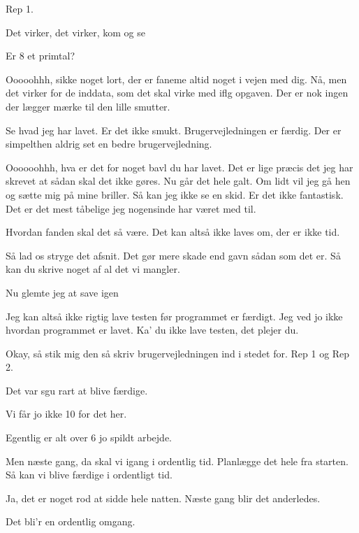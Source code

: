 \documentclass[a4paper,11pt]{article}
\begin{document}
\begin{sketch}
 Rep 1.

 Det virker, det virker, kom og se 

  Er 8 et primtal?

 Ooooohhh, sikke noget lort, der er faneme altid noget i vejen med dig.
Nå, men det virker for de inddata, som det skal virke med iflg opgaven.
Der er nok ingen der lægger mærke til den lille smutter.

  Se hvad jeg har
lavet. Er det ikke smukt. Brugervejledningen er færdig. Der er simpelthen aldrig
set en bedre brugervejledning.

  Oooooohhh, hva er det for noget bavl du
har lavet. Det er lige præcis det jeg har skrevet at sådan skal det ikke gøres.
Nu går det hele galt. Om lidt vil jeg gå hen og sætte mig på mine briller.
Så kan jeg ikke se en skid. Er det ikke fantastisk. Det er det mest tåbelige
jeg nogensinde har været med til.

 Hvordan fanden skal det så være. Det kan altså ikke laves om, der er ikke tid.

 Så lad os stryge det afsnit. Det gør mere skade end gavn sådan som det er.
Så kan du skrive noget af al det vi mangler.

  Nu glemte jeg at save igen 

 Jeg kan altså ikke rigtig lave testen før programmet er færdigt.
Jeg ved jo ikke hvordan programmet er lavet. Ka' du ikke lave testen, det
plejer du.

 Okay, så stik mig den så skriv brugervejledningen ind i stedet for.
Rep 1 og Rep 2.


 Det var sgu rart at blive færdige.

 Vi får jo ikke 10 for det her.

 Egentlig er alt over 6 jo spildt arbejde.

 Men næste gang, da skal vi igang i ordentlig tid. Planlægge det hele
fra starten. Så kan vi blive færdige i ordentligt tid.

 Ja, det er noget rod at sidde hele natten. Næste gang blir det
anderledes.

 Det bli'r en ordentlig omgang.
\end{sketch}
\end{document}

